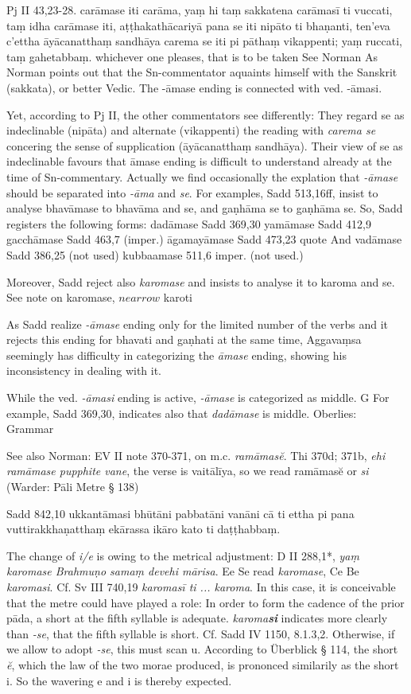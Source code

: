 \documentclass[11pt]{article}
\newcommand*\ṛ{r\symbol{"325}}
\newcommand*\Ṛ{R\symbol{"325}}
\newcommand*\ṝ{r\symbol{"304}\symbol{"325}}
\newcommand*\Ṝ{R\symbol{"304}\symbol{"325}}
\newcommand*\ḷ{l\symbol{"325}}
\newcommand*\ḹ{l\symbol{"304}\symbol{"325}}
\newcommand*\Ḷ{L\symbol{"325}}
\newcommand*\Ḹ{L\symbol{"304}\symbol{"325}}
\begin{document}
Pj II 43,23-28.
carāmase iti carāma, yaṃ hi taṃ sakkatena carāmasī ti vuccati, taṃ idha carāmase iti, aṭṭhakathācariyā pana se iti nipāto ti bhaṇanti,
ten'eva c'ettha āyācanatthaṃ sandhāya carema se iti pi pāthaṃ vikappenti; yaṃ ruccati, taṃ gahetabbaṃ.
whichever one pleases, that is to be taken
See Norman 
As Norman points out that the Sn-commentator aquaints himself with the Sanskrit (sakkata), or better Vedic.
The -āmase ending is connected with ved. -āmasi.

Yet, according to Pj II, the other commentators see differently:
They regard se as indeclinable (nipāta) and alternate (vikappenti) the reading with \textit{carema se} concering the sense of supplication (āyācanatthaṃ sandhāya).
Their view of se as indeclinable favours that āmase ending is difficult to understand already at the time of Sn-commentary.
Actually we find occasionally the explation that \textit{-āmase} should be separated into \textit{-āma} and \textit{se}. 
For examples, Sadd 513,16ff, insist to analyse bhavāmase to bhavāma and se, and gaṇhāma se to gaṇhāma se.
So, Sadd registers the following forms:
dadāmase Sadd 369,30 yamāmase Sadd 412,9 gacchāmase Sadd 463,7 (imper.) āgamayāmase Sadd 473,23 quote
And vadāmase Sadd 386,25 (not used) kubbaamase 511,6 imper. (not used.)

Moreover, Sadd reject also \textit{karomase} and insists to analyse it to karoma and se.
See note on karomase,  $nearrow$ karoti

As Sadd realize \textit{-āmase} ending only for the limited number of the verbs
and it rejects this ending for bhavati and gaṇhati at the same time,
Aggavaṃsa seemingly has difficulty in categorizing the \textit{āmase} ending, showing his inconsistency in dealing with it.

While the ved. \textit{-āmasi} ending is active, \textit{-āmase} is categorized as middle. G
For example, Sadd 369,30, indicates also that \textit{dadāmase} is middle.
Oberlies: Grammar 

See also Norman: EV II note 370-371, on m.c. \textit{ramāmas}\textit{\u{e}}.
Thi 370d; 371b, \textit{ehi ramāmase pupphite vane},
the verse is vaitālīya, so we read ramāmas\u{e} or \textit{si} (Warder: Pāli Metre § 138)

Sadd 842,10
ukkantāmasi bhūtāni pabbatāni vanāni cā ti ettha pi pana vuttirakkhaṇatthaṃ ekārassa ikāro kato ti daṭṭhabbaṃ.

The change of \textit{i/e} is owing to the metrical adjustment:
D II 288,1*, \textit{yaṃ karomase Brahmuṇo samaṃ devehi mārisa}.
Ee Se read \textit{karomase}, Ce Be \textit{karomasi}. Cf. Sv III 740,19 \textit{karomasī ti ... karoma}.
In this case, it is conceivable that the metre could have played a role:
In order to form the cadence of the prior pāda, a short at the fifth syllable is adequate.
\textit{karoma\textbf{si}} indicates more clearly than \textit{-se}, that the fifth syllable is short.
Cf. Sadd IV 1150, 8.1.3,2.
Otherwise, if we allow to adopt \textit{-se}, this must scan u.
According to Überblick § 114, the short \textit{\u{e}}, which the law of the two morae produced, is prononced similarily as the short i.
So the wavering e and i is thereby expected.
\end{document}
